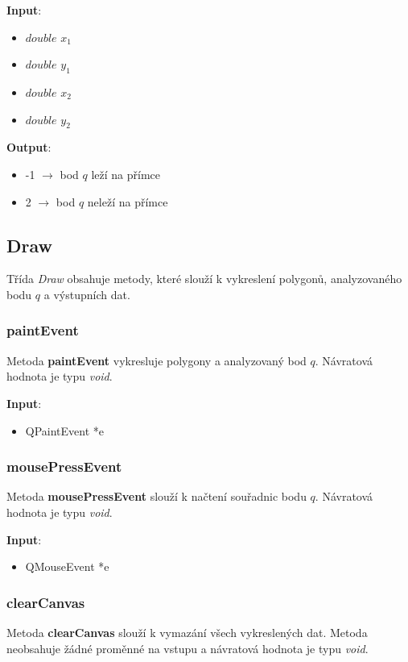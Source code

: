 \documentclass[a4paper, 12pt]{article}
\begin{document}
\textbf{Input}:
\begin{itemize}
\item $double$ $x_1$
\item $double$ $y_1$
\item $double$ $x_2$
\item $double$ $y_2$	
\end{itemize}

\textbf{Output}:
\begin{itemize}
\item -1 $\rightarrow$ bod $q$ leží na přímce
\item 2 $\rightarrow$ bod $q$ neleží na přímce
\end{itemize}

\subsection{Draw}
Třída \textsl{Draw} obsahuje metody, které slouží k vykreslení polygonů, analyzovaného bodu $q$ a výstupních dat.

\subsubsection{paintEvent}
Metoda \textbf{paintEvent} vykresluje polygony a analyzovaný bod $q$. Návratová hodnota je typu \textsl{void}.

\textbf{Input}:
\begin{itemize}
\item QPaintEvent *e
\end{itemize}

\subsubsection{mousePressEvent}
Metoda \textbf{mousePressEvent} slouží k načtení souřadnic bodu $q$. Návratová hodnota je typu \textsl{void}.

\textbf{Input}:
\begin{itemize}
\item QMouseEvent *e
\end{itemize}

\subsubsection{clearCanvas}
Metoda \textbf{clearCanvas} slouží k vymazání všech vykreslených dat. Metoda neobsahuje žádné proměnné na vstupu a návratová hodnota je typu \textsl{void}.
\end{document}
